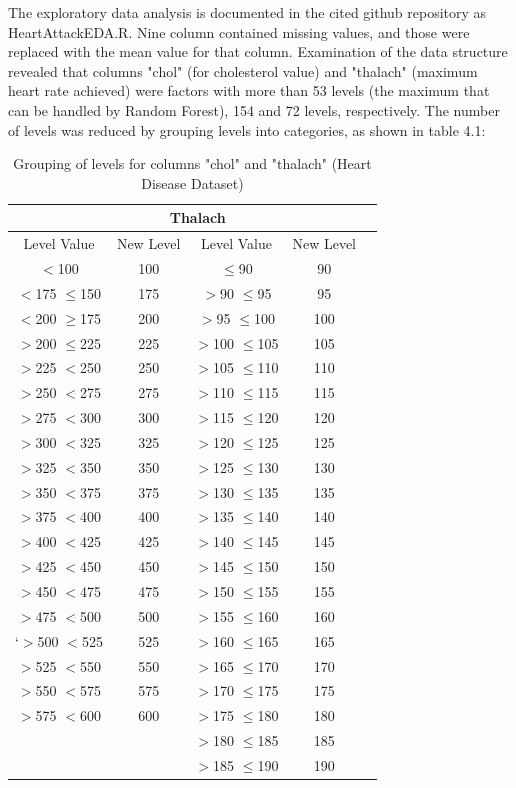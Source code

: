 The exploratory data analysis is documented in the cited github repository as HeartAttackEDA.R.\newline
Nine column contained missing values, and those were replaced with the mean value for that column. Examination of the data structure revealed that columns "chol" (for cholesterol value) and "thalach" (maximum heart rate achieved) were factors with more than 53 levels (the maximum that can be handled by Random Forest), 154 and 72 levels, respectively. The number of levels was reduced by grouping levels into categories, as shown in table 4.1:
\begin{table}[!htbp]
\centering
\begin{tabular}{*5c}
  \hline
  \rowcolor{LightCyan}
  \multicolumn{2}{c}{Cholesterol} & \multicolumn{2}{c}{Thalach} \\
  \hline
  \hline
Level Value & New Level & Level Value & New Level\\ 
  \hline
    $<$100  & 100 & $\leq$90 & 90 \\ 
   $<$175 $\leq$150 & 175 & $>$90 $\leq$95   &  95 \\ 
  $<$200 $\geq$175 & 200 & $>$95 $\leq$100  & 100  \\ 
   $>$200 $\leq$225 & 225 & $>$100 $\leq$105 & 105  \\ 
   $>$225 $<$250  & 250 & $>$105 $\leq$110 & 110  \\ 
   $>$250 $<$275  & 275 & $>$110 $\leq$115 & 115  \\ 
   $>$275 $<$300  & 300 & $>$115 $\leq$120 & 120   \\ 
   $>$300 $<$325  & 325 & $>$120 $\leq$125 & 125   \\ 
   $>$325 $<$350  & 350 & $>$125 $\leq$130 & 130  \\ 
   $>$350 $<$375  & 375 & $>$130 $\leq$135 & 135  \\ 
   $>$375 $<$400  & 400 & $>$135 $\leq$140 & 140 \\ 
   $>$400 $<$425  & 425 & $>$140 $\leq$145 & 145\\ 
   $>$425 $<$450  & 450 & $>$145 $\leq$150 & 150\\ 
   $>$450 $<$475  & 475 & $>$150 $\leq$155 & 155\\ 
   $>$475 $<$500  & 500 & $>$155 $\leq$160 & 160\\ 
  `$>$500 $<$525  & 525 & $>$160 $\leq$165 & 165 \\ 
   $>$525 $<$550  & 550 & $>$165 $\leq$170 & 170 \\ 
   $>$550 $<$575  & 575 & $>$170 $\leq$175 & 175 \\ 
   $>$575 $<$600  & 600 & $>$175 $\leq$180 & 180 \\ 
                  &     & $>$180 $\leq$185 & 185 \\ 
                  &     & $>$185 $\leq$190 & 190 \\ 
   \hline
\end{tabular}
\caption{Grouping of levels for columns "chol" and "thalach" (Heart Disease Dataset)}
\end{table}

